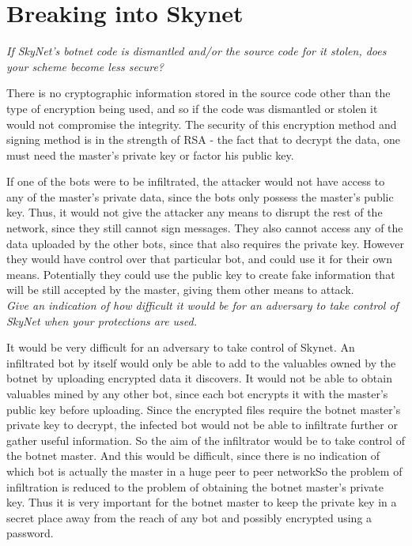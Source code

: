 \documentclass[9pt,a4paper]{article}
\begin{document}
\section{Breaking into Skynet}
\emph{If SkyNet's botnet code is dismantled and/or the source code for it stolen, does your scheme become less secure?}

There is no cryptographic information stored in the source code other than the type of encryption being used, and so if the code was dismantled or stolen it would not compromise the integrity. The security of this encryption method and signing method is in the strength of RSA - the fact that to decrypt the data, one must need the master's private key or factor his public key.

If one of the bots were to be infiltrated, the attacker would not have access to any of the master's private data, since the bots only possess the master's public key. Thus, it would not give the attacker any means to disrupt the rest of the network, since they still cannot sign messages. They also cannot access any of the data uploaded by the other bots, since that also requires the private key. However they would have control over that particular bot, and could use it for their own means. Potentially they could use the public key to create fake information that will be still accepted by the master, giving them other means to attack. \\



\emph{Give an indication of how difficult it would be for an adversary to take control of SkyNet when your protections are used.}

It would be very difficult for an adversary to take control of Skynet.
An infiltrated bot by itself would only be able to add to the valuables owned by the botnet by uploading encrypted data it discovers. It would not be able to obtain valuables mined by any other bot, since each bot encrypts it with the master's public key before uploading. Since the encrypted files require the botnet master's private key to decrypt, the infected bot would not be able to infiltrate further or gather useful information.
So the aim of the infiltrator would be to  take control of the botnet master. And this would be difficult, since there is no indication of which bot is actually the master in a huge peer to peer networkSo the problem of infiltration is reduced to the problem of obtaining the botnet master's private key. Thus it is very important for the botnet master to keep the private key in a secret place away from the reach of any bot and possibly encrypted using a password.
\end{document}
